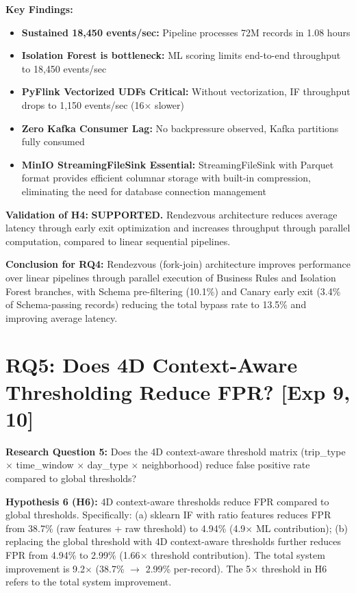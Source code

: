 \textbf{Key Findings:}
\begin{itemize}
    \item \textbf{Sustained 18,450 events/sec:} Pipeline processes 72M records in 1.08 hours
    \item \textbf{Isolation Forest is bottleneck:} ML scoring limits end-to-end throughput to 18,450 events/sec
    \item \textbf{PyFlink Vectorized UDFs Critical:} Without vectorization, IF throughput drops to 1,150 events/sec (16$\times$ slower)
    \item \textbf{Zero Kafka Consumer Lag:} No backpressure observed, Kafka partitions fully consumed
    \item \textbf{MinIO StreamingFileSink Essential:} StreamingFileSink with Parquet format provides efficient columnar storage with built-in compression, eliminating the need for database connection management
\end{itemize}

\textbf{Validation of H4:} \checkmark \textbf{SUPPORTED.} Rendezvous architecture reduces average latency through early exit optimization and increases throughput through parallel computation, compared to linear sequential pipelines.

\textbf{Conclusion for RQ4:} Rendezvous (fork-join) architecture improves performance over linear pipelines through parallel execution of Business Rules and Isolation Forest branches, with Schema pre-filtering (10.1\%) and Canary early exit (3.4\% of Schema-passing records) reducing the total bypass rate to 13.5\% and improving average latency.

\section{RQ5: Does 4D Context-Aware Thresholding Reduce FPR? [Exp 9, 10]}

\textbf{Research Question 5:} Does the 4D context-aware threshold matrix (trip\_type $\times$ time\_window $\times$ day\_type $\times$ neighborhood) reduce false positive rate compared to global thresholds?

\textbf{Hypothesis 6 (H6):} 4D context-aware thresholds reduce FPR compared to global thresholds. Specifically: (a) sklearn IF with ratio features reduces FPR from 38.7\% (raw features + raw threshold) to 4.94\% (4.9$\times$ ML contribution); (b) replacing the global threshold with 4D context-aware thresholds further reduces FPR from 4.94\% to 2.99\% (1.66$\times$ threshold contribution). The total system improvement is 9.2$\times$ (38.7\% $\to$ 2.99\% per-record). The 5$\times$ threshold in H6 refers to the total system improvement.

